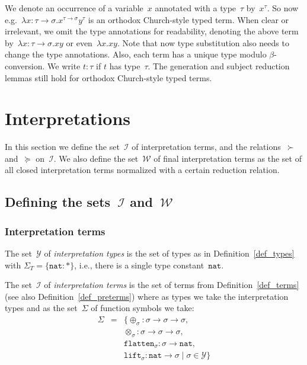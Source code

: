 \documentclass[runningheads,a4paper]{llncs}
\newcommand{\Iterms}{\mathcal{I}}
\newcommand{\World}{\mathcal{W}}
\newcommand{\ITypes}{\mathcal{Y}}
\newcommand{\arrtype}{\rightarrow}
\newcommand{\nat}{\mathtt{nat}}
\newcommand{\flatten}{\mathtt{flatten}}
\newcommand{\lift}{\mathtt{lift}}
\begin{document}
We denote an occurrence of a variable~$x$ annotated with a type~$\tau$
by~$x^\tau$. So now e.g.~$\lambda x : \tau\arrtype\sigma
. x^{\tau\arrtype\sigma}y^\tau$ is an orthodox Church-style typed
term. When clear or irrelevant, we omit the type annotations for
readability, denoting the above term by~$\lambda x :
\tau\arrtype\sigma . x y$ or even~$\lambda x . x y$. Note that now
type substitution also needs to change the type annotations. Also,
each term has a unique type modulo $\beta$-conversion. We write $t :
\tau$ if $t$ has type~$\tau$. The generation and subject reduction
lemmas still hold for orthodox Church-style typed terms.

\section{Interpretations}

In this section we define the set~$\Iterms$ of interpretation terms,
and the relations~$\succ$ and~$\succeq$ on~$\Iterms$. We also define
the set~$\World$ of final interpretation terms as the set of all closed
interpretation terms normalized with a certain reduction relation.

\subsection{Defining the sets~$\Iterms$ and~$\World$}\label{sec_world}

\subsubsection{Interpretation terms}

\begin{definition}\label{def_iterms}\normalfont
  The set~$\ITypes$ of \emph{interpretation types} is the set of types
  as in Definition~\ref{def_types} with $\Sigma_T = \{ \nat : * \}$,
  i.e., there is a single type constant~$\nat$.

  The set~$\Iterms$ of \emph{interpretation terms} is the set of terms
  from Definition~\ref{def_terms} (see also
  Definition~\ref{def_preterms}) where as types we take the
  interpretation types and as the set~$\Sigma$ of function symbols we
  take:
  \[
    \begin{array}{rcl}
      \Sigma &=& \{ \oplus_\sigma : \sigma \arrtype
                 \sigma \arrtype \sigma,\\ & & \otimes_\sigma : \sigma \arrtype \sigma
                 \arrtype \sigma,\\ & & \flatten_{\sigma} : \sigma \arrtype
                 \nat,\\ & & \lift_{\sigma} : \nat \arrtype \sigma \mid \sigma \in \ITypes
                 \}
    \end{array}
  \]
\end{definition}
\end{document}
